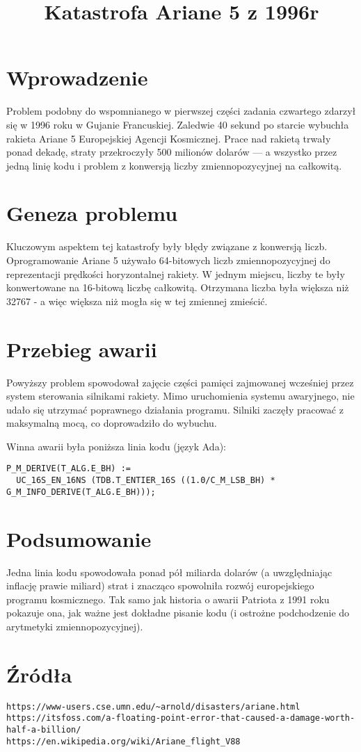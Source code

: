 \documentclass{article}
\begin{document}
\title{Katastrofa Ariane 5 z 1996r}
\author{}
\date{}

\maketitle

\section*{Wprowadzenie}
Problem podobny do wspomnianego w pierwszej części zadania czwartego zdarzył się w 1996 roku w Gujanie Francuskiej. Zaledwie 40 sekund po starcie wybuchła rakieta Ariane 5 Europejskiej Agencji Kosmicznej. Prace nad rakietą trwały ponad dekadę, straty przekroczyły 500 milionów dolarów --- a wszystko przez jedną linię kodu i problem z konwersją liczby zmiennopozycyjnej na całkowitą.

\section*{Geneza problemu}
Kluczowym aspektem tej katastrofy były błędy związane z konwersją liczb. Oprogramowanie Ariane 5 używało 64-bitowych liczb zmiennopozycyjnej do reprezentacji prędkości horyzontalnej rakiety. W jednym miejscu, liczby te były konwertowane na 16-bitową liczbę całkowitą. Otrzymana liczba była większa niż 32767 - a więc większa niż mogła się w tej zmiennej zmieścić.

\section*{Przebieg awarii}
Powyższy problem spowodował zajęcie części pamięci zajmowanej wcześniej przez system sterowania silnikami rakiety. Mimo uruchomienia systemu awaryjnego, nie udało się utrzymać poprawnego działania programu. Silniki zaczęły pracować z maksymalną mocą, co doprowadziło do wybuchu.

Winna awarii była poniższa linia kodu (język Ada):
\begin{verbatim}
P_M_DERIVE(T_ALG.E_BH) := 
  UC_16S_EN_16NS (TDB.T_ENTIER_16S ((1.0/C_M_LSB_BH) * G_M_INFO_DERIVE(T_ALG.E_BH)));
\end{verbatim}

\section*{Podsumowanie}

Jedna linia kodu spowodowała ponad pół miliarda dolarów (a uwzględniając inflację prawie miliard) strat i znacząco spowolniła rozwój europejskiego programu kosmicznego. Tak samo jak historia o awarii Patriota z 1991 roku pokazuje ona, jak ważne jest dokładne pisanie kodu (i ostrożne podchodzenie do arytmetyki zmiennopozycyjnej).

\section*{Źródła}
\begin{verbatim}
https://www-users.cse.umn.edu/~arnold/disasters/ariane.html
https://itsfoss.com/a-floating-point-error-that-caused-a-damage-worth-half-a-billion/
https://en.wikipedia.org/wiki/Ariane_flight_V88
\end{verbatim}
\end{document}

